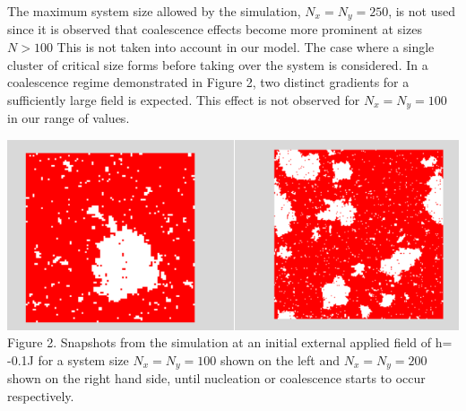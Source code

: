 \documentclass{article}
\begin{document}
\begin{multicols*}{2}
The maximum system size allowed by the simulation, $N_{x} = N_{y} = 250$, is not used since it is observed that coalescence effects become more prominent at sizes $N > 100$ This is not taken into account in our model. The case where a single cluster of critical size forms before taking over the system is considered. In a coalescence regime demonstrated in Figure 2, two distinct gradients for a sufficiently large field is expected. This effect is not observed for $N_{x} = N_{y} = 100$ in our range of values. 
\newline
\newline
\begin{Figure}
\centering
\includegraphics[width=\linewidth]{100vs200coalescence.png}
\footnotesize
Figure 2. Snapshots from the simulation at an initial external applied field of h= -0.1J for a system size $N_{x}=N_{y}=100$ shown on the left and $N_{x}=N_{y}=200$ shown on the right hand side, until nucleation or coalescence starts to occur respectively.
\end{Figure}
\normalsize
\newline


\end{multicols*}
\end{document}
